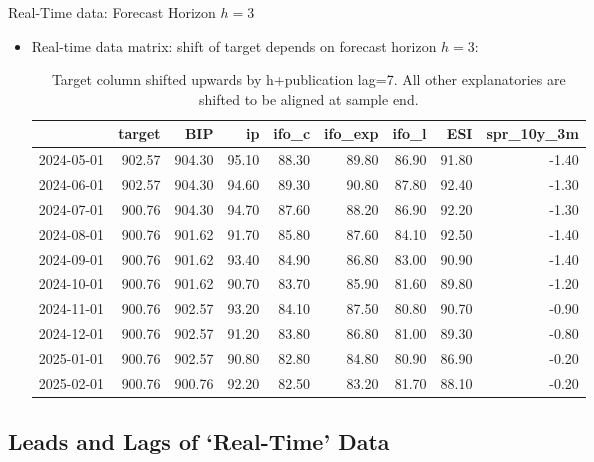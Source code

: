 \documentclass{beamer}
\begin{document}
\begin{frame} {Real-Time data: Forecast Horizon $h=3$}

\begin{itemize}

\item Real-time data matrix: shift of target depends on forecast horizon $h=3$: 

\begin{table}[ht]
\centering
\begin{tabular}{rrrrrrrrr}
  \hline
 & target & BIP & ip & ifo\_c & ifo\_exp & ifo\_l & ESI & spr\_10y\_3m \\ 
  \hline
2024-05-01 & 902.57 & 904.30 & 95.10 & 88.30 & 89.80 & 86.90 & 91.80 & -1.40 \\ 
  2024-06-01 & 902.57 & 904.30 & 94.60 & 89.30 & 90.80 & 87.80 & 92.40 & -1.30 \\ 
  2024-07-01 & 900.76 & 904.30 & 94.70 & 87.60 & 88.20 & 86.90 & 92.20 & -1.30 \\ 
  2024-08-01 & 900.76 & 901.62 & 91.70 & 85.80 & 87.60 & 84.10 & 92.50 & -1.40 \\ 
  2024-09-01 & 900.76 & 901.62 & 93.40 & 84.90 & 86.80 & 83.00 & 90.90 & -1.40 \\ 
  2024-10-01 & 900.76 & 901.62 & 90.70 & 83.70 & 85.90 & 81.60 & 89.80 & -1.20 \\ 
  2024-11-01 & 900.76 & 902.57 & 93.20 & 84.10 & 87.50 & 80.80 & 90.70 & -0.90 \\ 
  2024-12-01 & 900.76 & 902.57 & 91.20 & 83.80 & 86.80 & 81.00 & 89.30 & -0.80 \\ 
  2025-01-01 & 900.76 & 902.57 & 90.80 & 82.80 & 84.80 & 80.90 & 86.90 & -0.20 \\ 
  2025-02-01 & 900.76 & 900.76 & 92.20 & 82.50 & 83.20 & 81.70 & 88.10 & -0.20 \\ 
   \hline
\end{tabular}
\caption{Target column shifted upwards by h+publication lag=7. All other explanatories are shifted to be aligned at sample end.  } 
\label{perf_var1}
\end{table}\end{itemize}

\end{frame}

\subsection{Leads and Lags of `Real-Time' Data}
\end{document}
